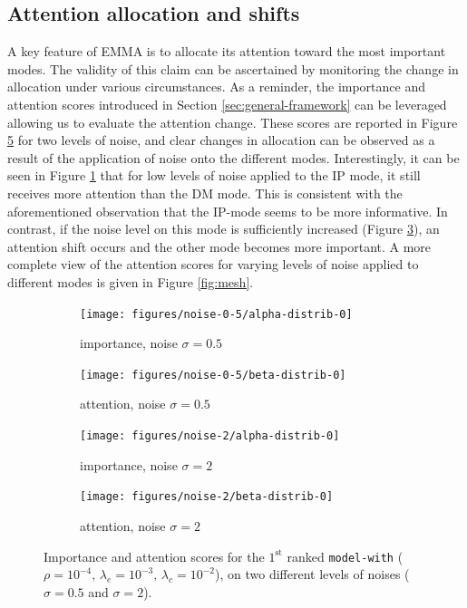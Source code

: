 \subsection*{Attention allocation and shifts}
A key feature of EMMA is to allocate its attention toward the most important modes. The validity of this claim can be ascertained by monitoring the change in allocation under various circumstances. As a reminder, the importance and attention scores introduced in Section \ref{sec:general-framework} can be leveraged allowing us to evaluate the attention change. These scores are reported in Figure \ref{fig:exp-att-shift-1} for two levels of noise, and clear changes in allocation can be observed as a result of the application of noise onto the different modes. Interestingly, it can be seen in Figure \ref{fig:exp-att-shift-1-a} that for low levels of noise applied to the IP mode, it still receives more attention than the DM mode. This is consistent with the aforementioned observation that the IP-mode seems to be more informative. In contrast, if the noise level on this mode is sufficiently increased (Figure \ref{fig:exp-att-shift-1-c}), an attention shift occurs and the other mode becomes more important. A more complete view of the attention scores for varying levels of noise applied to different modes is given in Figure \ref{fig:mesh}.
\begin{figure}[!h]
\centering
\begin{subfigure}{.5\textwidth}
  \centering
  \texttt{[image: figures/noise-0-5/alpha-distrib-0]}
  \caption{importance, noise $\sigma=0.5$} 
  \label{fig:exp-att-shift-1-a}
\end{subfigure}%
\begin{subfigure}{.5\textwidth}
  \centering
  \texttt{[image: figures/noise-0-5/beta-distrib-0]}
  \caption{attention, noise $\sigma=0.5$} 
  \label{fig:exp-att-shift-1-b}
\end{subfigure}
\begin{subfigure}{.5\textwidth}
  \centering
  \texttt{[image: figures/noise-2/alpha-distrib-0]}
  \caption{importance, noise $\sigma=2$}
  \label{fig:exp-att-shift-1-c} 
\end{subfigure}%
\begin{subfigure}{.5\textwidth}
  \centering
  \texttt{[image: figures/noise-2/beta-distrib-0]}
  \caption{attention, noise $\sigma=2$} 
  \label{fig:exp-att-shift-1-d}
\end{subfigure}
\caption[Importance and attention scores for the $1^{\text{st}}$ ranked model]{Importance and attention scores for the $1^{\text{st}}$ ranked \texttt{model-with} ($\rho=10^{-4},\,\lambda_e=10^{-3},\,\lambda_c=10^{-2}$), on two different levels of noises ($\sigma=0.5$ and $\sigma=2$).}
\label{fig:exp-att-shift-1}
\end{figure}
